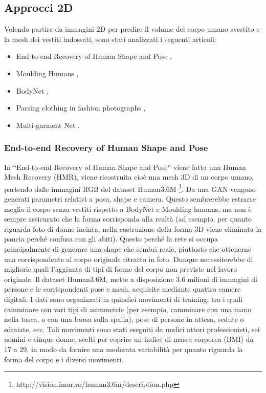 \medskip

\subsection{Approcci 2D}

Volendo partire da immagini 2D per predire il volume del corpo umano svestito e la mesh dei vestiti indossati, sono stati analizzati i seguenti articoli:

\begin{itemize}
\item End-to-end Recovery of Human Shape and Pose \cite{kanazawa2018end},
\item Moulding Humans \cite{gabeur2019moulding},
\item BodyNet \cite{varol2018bodynet},
\item Parsing clothing in fashion photographs \cite{yamaguchi2012parsing},
\item Multi-garment Net \cite{bhatnagar2019multi}.

\end{itemize}


\subsubsection{End-to-end Recovery of Human Shape and Pose}

In “End-to-end Recovery of Human Shape and Pose” \cite{kanazawa2018end} viene fatta una Human Mesh Recovery (HMR), viene ricostruita cioè una mesh 3D di un corpo umano, partendo dalle immagini RGB del dataset Human3.6M \footnote{http://vision.imar.ro/human3.6m/description.php}.
Da una GAN vengono generati parametri relativi a posa, shape e camera.
Questo sembrerebbe estrarre meglio il corpo senza vestiti rispetto a BodyNet e Moulding humans, ma non è sempre assicurato che la forma corrisponda alla realtà (ad esempio, per quanto riguarda foto di donne incinta, nella costruzione della forma 3D viene eliminata la pancia perché confusa con gli abiti). Questo perché la rete si occupa principalmente di generare una shape che sembri reale, piuttosto che ottenerne una corrispondente al corpo originale ritratto in foto.
Dunque necessiterebbe di migliorie quali l’aggiunta di tipi di forme del corpo non previste nel lavoro originale.
Il dataset Human3.6M, mette a disposizione 3.6 milioni di immagini di persone e le corrispondenti pose e mesh, acquisite mediante quattro camere digitali. I dati sono organizzati in quindici movimenti di training, tra i quali camminare con vari tipi di asimmetrie (per esempio, camminare con una mano nella tasca, o con una borsa sulla spalla), pose di persone in attesa, sedute o sdraiate, ecc. Tali movimenti sono stati eseguiti da undici attori professionisti, sei uomini e cinque donne, scelti per coprire un indice di massa corporea (BMI) da 17 a 29, in modo da fornire una moderata variabilità per quanto riguarda la forma del corpo e i diversi movimenti.


